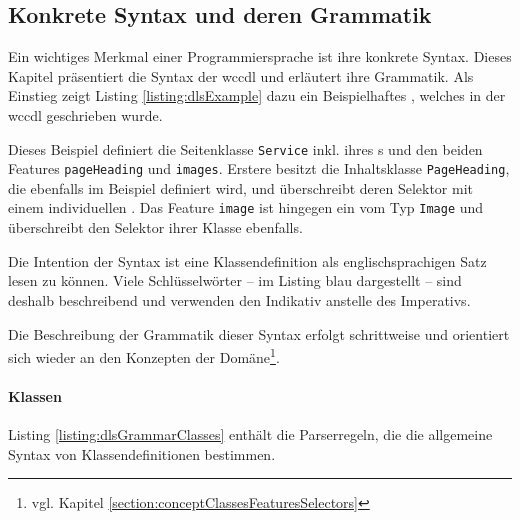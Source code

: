 \subsection{Konkrete Syntax und deren Grammatik}
    Ein wichtiges Merkmal einer Programmiersprache ist ihre konkrete Syntax.
    Dieses Kapitel präsentiert die Syntax der \gls{wccdl} und erläutert ihre Grammatik.    
    Als Einstieg zeigt Listing \ref{listing:dlsExample}
    dazu ein Beispielhaftes {\classificationModel},
    welches in der \gls{wccdl} geschrieben wurde.

    

    Dieses Beispiel definiert die Seitenklasse \texttt{Service} inkl.
    ihres {\urlSelector}s und den beiden Features \texttt{pageHeading} und \texttt{images}.
    Erstere besitzt die Inhaltsklasse \texttt{PageHeading}, die ebenfalls im Beispiel definiert wird,
    und überschreibt deren Selektor mit einem individuellen {\cssSelector}.
    Das Feature \texttt{image} ist hingegen ein {} vom Typ
    \texttt{Image} und überschreibt den Selektor ihrer Klasse ebenfalls.

    Die Intention der Syntax ist eine Klassendefinition
    als englischsprachigen Satz lesen zu können.
    Viele Schlüsselwörter -- im Listing blau dargestellt --
    sind deshalb beschreibend und verwenden
    den Indikativ anstelle des Imperativs.  

    Die Beschreibung der Grammatik dieser Syntax erfolgt schrittweise
    und orientiert sich wieder an den Konzepten der
    Domäne\footnote{vgl. Kapitel \ref{section:conceptClassesFeaturesSelectors}}.
    
    \paragraph{Klassen}
    Listing \ref{listing:dlsGrammarClasses} enthält die Parserregeln,
    die die allgemeine Syntax von Klassendefinitionen bestimmen.

    

